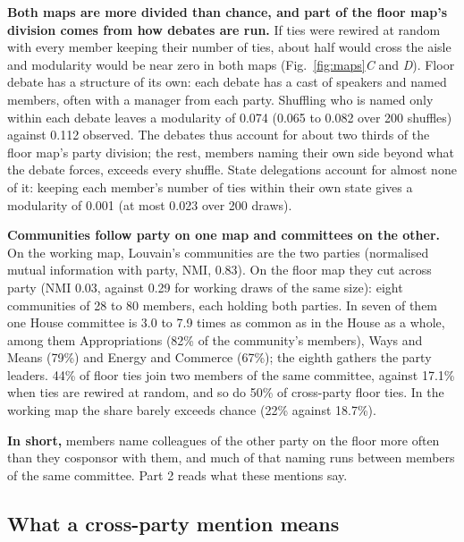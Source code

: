 \documentclass[9pt,twocolumn,twoside]{pnas-new}
\begin{document}
\textbf{Both maps are more divided than chance, and part of the floor map's division comes from how debates are
run.} If ties were rewired at random with every member keeping their number of ties, about half would cross the aisle
and modularity would be near zero in both maps (Fig.~\ref{fig:maps}\emph{C} and \emph{D}). Floor debate has a
structure of its own: each debate has a cast of speakers and named members, often with a manager from each party. Shuffling who is named only within each debate leaves a modularity of 0.074 (0.065 to 0.082
over 200 shuffles) against 0.112 observed. The debates thus account for about two thirds of the floor map's party
division; the rest, members naming their own side beyond what the debate forces, exceeds every shuffle. State
delegations account for almost none of it: keeping each member's number of ties within their own state gives a
modularity of 0.001 (at most 0.023 over 200 draws).

\textbf{Communities follow party on one map and committees on the other.} On the working map, Louvain's communities
are the two parties (normalised mutual information with party, NMI, 0.83). On the floor map they cut across party
(NMI 0.03, against 0.29 for working draws of the same size): eight communities of 28 to 80 members, each holding both
parties. In seven of them one House committee is 3.0 to 7.9 times as common as in the House as a whole, among them
Appropriations (82\% of the community's members), Ways and Means (79\%) and Energy and Commerce (67\%); the eighth
gathers the party leaders. 44\% of floor ties join two members of the same committee, against 17.1\% when ties are
rewired at random, and so do 50\% of cross-party floor ties. In the working map the share barely exceeds chance (22\%
against 18.7\%).

\textbf{In short,} members name colleagues of the other party on the floor more often than they cosponsor with them,
and much of that naming runs between members of the same committee. Part 2 reads what these mentions say.

\subsection*{What a cross-party mention means}
\end{document}
